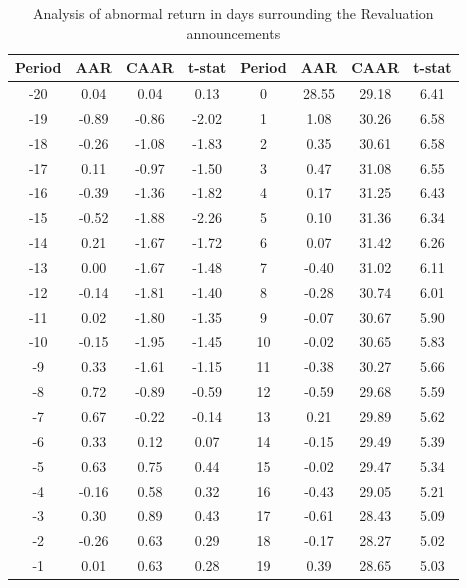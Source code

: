 \documentclass{beamer}
\begin{document}
\begin{frame}

 \centering
\begin{table}[htbp]
  \centering
  
\captionsetup{labelformat=empty}
  \caption{\tiny Analysis of abnormal return in days surrounding the Revaluation announcements}
  \resizebox{0.8\textheight}{!}
  {\tiny
    \begin{tabular}{cccc|cccc}
    \hline\hline 
      Period & \multicolumn{1}{c}{AAR} & \multicolumn{1}{c}{CAAR} & \multicolumn{1}{c}{t-stat} & Period & \multicolumn{1}{c}{AAR} & \multicolumn{1}{c}{CAAR} & \multicolumn{1}{c}{t-stat} \\
      \hline
        -20   & 0.04  & 0.04  & 0.13  & 0     & 28.55 & 29.18 & 6.41 \\
        -19   & -0.89 & -0.86 & -2.02 & 1     & 1.08  & 30.26 & 6.58 \\
        -18   & -0.26 & -1.08 & -1.83 & 2     & 0.35  & 30.61 & 6.58 \\
        -17   & 0.11  & -0.97 & -1.50 & 3     & 0.47  & 31.08 & 6.55 \\
        -16   & -0.39 & -1.36 & -1.82 & 4     & 0.17  & 31.25 & 6.43 \\
        -15   & -0.52 & -1.88 & -2.26 & 5     & 0.10  & 31.36 & 6.34 \\
        -14   & 0.21  & -1.67 & -1.72 & 6     & 0.07  & 31.42 & 6.26 \\
        -13   & 0.00  & -1.67 & -1.48 & 7     & -0.40 & 31.02 & 6.11 \\
        -12   & -0.14 & -1.81 & -1.40 & 8     & -0.28 & 30.74 & 6.01 \\
        -11   & 0.02  & -1.80 & -1.35 & 9     & -0.07 & 30.67 & 5.90 \\
        -10   & -0.15 & -1.95 & -1.45 & 10    & -0.02 & 30.65 & 5.83 \\
        -9    & 0.33  & -1.61 & -1.15 & 11    & -0.38 & 30.27 & 5.66 \\
        -8    & 0.72  & -0.89 & -0.59 & 12    & -0.59 & 29.68 & 5.59 \\
        -7    & 0.67  & -0.22 & -0.14 & 13    & 0.21  & 29.89 & 5.62 \\
        -6    & 0.33  & 0.12  & 0.07  & 14    & -0.15 & 29.49 & 5.39 \\
        -5    & 0.63  & 0.75  & 0.44  & 15    & -0.02 & 29.47 & 5.34 \\
        -4    & -0.16 & 0.58  & 0.32  & 16    & -0.43 & 29.05 & 5.21 \\
        -3    & 0.30  & 0.89  & 0.43  & 17    & -0.61 & 28.43 & 5.09 \\
        -2    & -0.26 & 0.63  & 0.29  & 18    & -0.17 & 28.27 & 5.02 \\
        -1    & 0.01  & 0.63  & 0.28  & 19    & 0.39  & 28.65 & 5.03 \\
    \hline\hline
    \end{tabular}%
}
\end{table}%

    
\end{frame}
\end{document}
